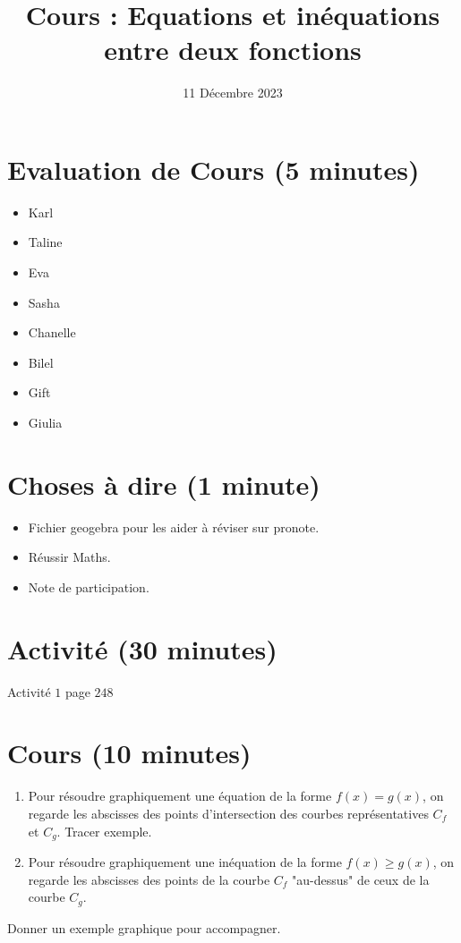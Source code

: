 \documentclass{article}
\title{Cours : Equations et inéquations entre deux fonctions}
\date{11 Décembre 2023}
\begin{document}
\maketitle
\section{Evaluation de Cours (5 minutes)}
\begin{itemize}
\item Karl
\item Taline
\item Eva
\item Sasha
\item Chanelle
\item Bilel
\item Gift
\item Giulia
\end{itemize}
\section{Choses à dire (1 minute)}
\begin{itemize}
\item Fichier geogebra pour les aider à réviser sur pronote.
\item Réussir Maths.
\item Note de participation.
\end{itemize}
\section{Activité (30 minutes)}
Activité $1$ page $248$
\section{Cours (10 minutes)}
\begin{proposition}
\begin{enumerate}
\item Pour résoudre graphiquement une équation de la forme $f(x) = g(x)$, on regarde les abscisses des points d'intersection des courbes représentatives $C_f$ et $C_g$. Tracer exemple.
\item Pour résoudre graphiquement une inéquation de la forme $f(x) \geq g(x)$, on regarde les abscisses des points de la courbe $C_f$ "au-dessus" de ceux de la courbe $C_g$.
\end{enumerate}
Donner un exemple graphique pour accompagner.
\end{proposition}
\end{document}
